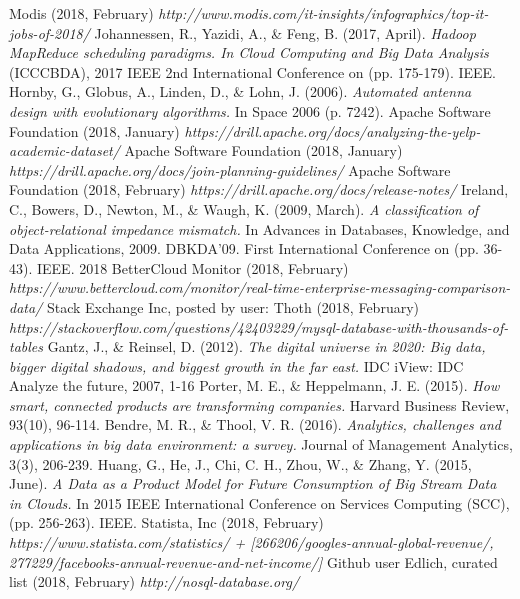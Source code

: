 \documentclass[a4paper,english]{report}
\begin{document}
\begin{thebibliography}{1}
		Modis (2018, February) \emph{http://www.modis.com/it-insights/infographics/top-it-jobs-of-2018/}
		Johannessen, R., Yazidi, A., \& Feng, B. (2017, April). \emph{Hadoop MapReduce scheduling paradigms. In Cloud Computing and Big Data Analysis} (ICCCBDA), 2017 IEEE 2nd International Conference on (pp. 175-179). IEEE.
		Hornby, G., Globus, A., Linden, D., \& Lohn, J. (2006). \emph{Automated antenna design with evolutionary algorithms.} In Space 2006 (p. 7242).
		Apache Software Foundation (2018, January) \emph{https://drill.apache.org/docs/analyzing-the-yelp-academic-dataset/}
		Apache Software Foundation (2018, January)
		\emph{https://drill.apache.org/docs/join-planning-guidelines/}
		Apache Software Foundation (2018, February) 	\emph{https://drill.apache.org/docs/release-notes/}
		Ireland, C., Bowers, D., Newton, M., \& Waugh, K. (2009, March). \emph{A classification of object-relational impedance mismatch.} In Advances in Databases, Knowledge, and Data Applications, 2009. DBKDA'09. First International Conference on (pp. 36-43). IEEE.
		2018 BetterCloud Monitor (2018, February)
		\emph{https://www.bettercloud.com/monitor/real-time-enterprise-messaging-comparison-data/}
		Stack Exchange Inc, posted by user: Thoth (2018, February) \emph{https://stackoverflow.com/questions/42403229/mysql-database-with-thousands-of-tables}
		Gantz, J., \& Reinsel, D. (2012). \emph{The digital universe in 2020: Big data, bigger digital shadows, and biggest growth in the far east.} IDC iView: IDC Analyze the future, 2007, 1-16
		Porter, M. E., \& Heppelmann, J. E. (2015). \emph{How smart, connected products are transforming companies.} Harvard Business Review, 93(10), 96-114.
		Bendre, M. R., \& Thool, V. R. (2016). \emph{Analytics, challenges and applications in big data environment: a survey.} Journal of Management Analytics, 3(3), 206-239.
		Huang, G., He, J., Chi, C. H., Zhou, W., \& Zhang, Y. (2015, June). \emph{A Data as a Product Model for Future Consumption of Big Stream Data in	Clouds.} In 2015 IEEE International Conference on Services Computing (SCC), (pp. 256-263). IEEE.
		Statista, Inc (2018, February) \emph{https://www.statista.com/statistics/ + [266206/googles-annual-global-revenue/, 277229/facebooks-annual-revenue-and-net-income/]}
		Github user Edlich, curated list (2018, February) \emph{http://nosql-database.org/}

\end{thebibliography}
\end{document}
